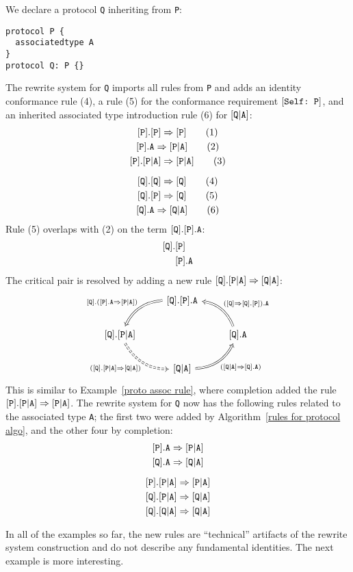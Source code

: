 \documentclass[../generics]{subfiles}
\begin{document}
\begin{example}
We declare a protocol \texttt{Q} inheriting from \texttt{P}:
\begin{Verbatim}
protocol P {
  associatedtype A
}
protocol Q: P {}
\end{Verbatim}
The rewrite system for \texttt{Q} imports all rules from \texttt{P} and adds an identity conformance rule (4), a rule (5) for the conformance requirement $[\texttt{Self:~P}]$, and an inherited associated type introduction rule (6) for $[\texttt{Q}|\texttt{A}]$:
\begin{gather*}
\ProtoInherit{P}{P}\tag{1}\\
\AssocIntro{P}{A}\tag{2}\\
\protosym{P}.\assocsym{P}{A}\Rightarrow\assocsym{P}{A}\tag{3}\\[\medskipamount]
\ProtoInherit{Q}{Q}\tag{4}\\
\ProtoInherit{Q}{P}\tag{5}\\
\AssocIntro{Q}{A}\tag{6}
\end{gather*}
Rule (5) overlaps with (2) on the term $[\texttt{Q}].[\texttt{P}].\texttt{A}$:
\begin{align*}
[\texttt{Q}].&[\texttt{P}]\\
&[\texttt{P}].\texttt{A}
\end{align*}
The critical pair is resolved by adding a new rule $[\texttt{Q}].[\texttt{P}|\texttt{A}]\Rightarrow[\texttt{Q}|\texttt{A}]$:
\[
\FourLoopDerived%
{\protosym{Q}.\protosym{P}.\texttt{A}}%
{\protosym{Q}.\assocsym{P}{A}}%
{\assocsym{Q}{A}}%
{\protosym{Q}.\texttt{A}}%
{\protosym{Q}.(\AssocIntro{P}{A})}%
{(\protosym{Q}.\assocsym{P}{A}\Rightarrow\assocsym{Q}{A})}%
{(\AssocIntroInv{Q}{A})}%
{(\ProtoInheritInv{Q}{P}).\texttt{A}}
\]
This is similar to Example~\ref{proto assoc rule}, where completion added the rule $[\texttt{P}].[\texttt{P}|\texttt{A}]\Rightarrow[\texttt{P}|\texttt{A}]$. The rewrite system for \texttt{Q} now has the following rules related to the associated type \texttt{A}; the first two were added by Algorithm~\ref{rules for protocol algo}, and the other four by completion:
\begin{gather*}
\protosym{P}.\texttt{A}\Rightarrow\assocsym{P}{A}\\
\protosym{Q}.\texttt{A}\Rightarrow\assocsym{Q}{A}\\[\medskipamount]
\protosym{P}.\assocsym{P}{A}\Rightarrow\assocsym{P}{A}\\
\protosym{Q}.\assocsym{P}{A}\Rightarrow\assocsym{Q}{A}\\
\protosym{Q}.\assocsym{Q}{A}\Rightarrow\assocsym{Q}{A}
\end{gather*}
\end{example}
In all of the examples so far, the new rules are ``technical'' artifacts of the rewrite system construction and do not describe any fundamental identities. The next example is more interesting.
\end{document}
